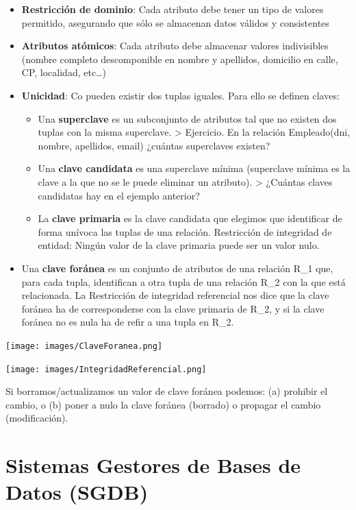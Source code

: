 \documentclass[
]{book}
\providecommand{\tightlist}{%
  \setlength{\itemsep}{0pt}\setlength{\parskip}{0pt}}
\begin{document}
\begin{itemize}
\tightlist
\item
  \textbf{Restricción de dominio}: Cada atributo debe tener un tipo de valores permitido, asegurando que sólo se almacenan datos válidos y consistentes
\item
  \textbf{Atributos atómicos}: Cada atributo debe almacenar valores indivisibles (nombre completo descomponible en nombre y apellidos, domicilio en calle, CP, localidad, etc\ldots)
\item
  \textbf{Unicidad}: Co pueden existir dos tuplas iguales. Para ello se definen claves:

  \begin{itemize}
  \tightlist
  \item
    Una \textbf{superclave} es un subconjunto de atributos tal que no existen dos tuplas con la misma superclave.
    \textgreater{} Ejercicio. En la relación Empleado(dni, nombre, apellidos, email) ¿cuántas superclaves existen?
  \item
    Una \textbf{clave candidata} es una superclave mínima (superclave mínima es la clave a la que no se le puede eliminar un atributo).
    \textgreater{} ¿Cuántas claves candidatas hay en el ejemplo anterior?
  \item
    La \textbf{clave primaria} es la clave candidata que elegimos que identificar de forma unívoca las tuplas de una relación. Restricción de integridad de entidad: Ningún valor de la clave primaria puede ser un valor nulo.
  \end{itemize}
\item
  Una \textbf{clave foránea} es un conjunto de atributos de una relación R\_1 que, para cada tupla, identifican a otra tupla de una relación R\_2 con la que está relacionada.
  La Restricción de integridad referencial nos dice que la clave foránea ha de corresponderse con la clave primaria de R\_2, y si la clave foránea no es nula ha de refir a una tupla en R\_2.
\end{itemize}

\texttt{[image: images/ClaveForanea.png]}

\texttt{[image: images/IntegridadReferencial.png]}

Si borramos/actualizamos un valor de clave foránea podemos: (a) prohibir el cambio, o (b) poner a nulo la clave foránea (borrado) o propagar el cambio (modificación).

\section{Sistemas Gestores de Bases de Datos (SGDB)}\label{sistemas-gestores-de-bases-de-datos-sgdb}
\end{document}
